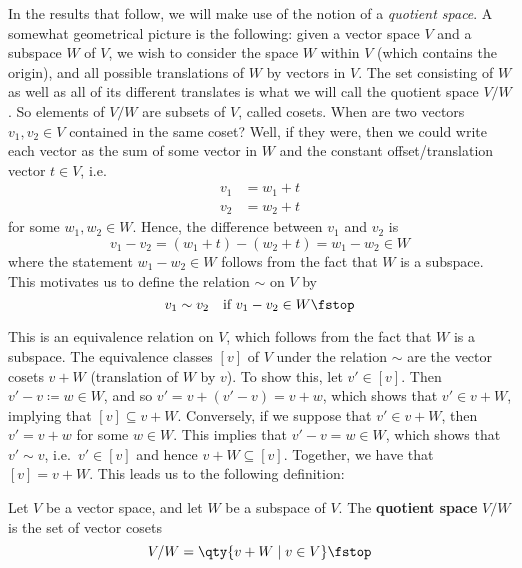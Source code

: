  In the results that follow, we will make use of the notion of a \emph{quotient space}. A somewhat geometrical picture is the following: given a vector space \( V \) and a subspace \( W \) of \( V \), we wish to consider the space \( W \) within \( V \) (which contains the origin), and all possible translations of \( W \) by vectors in \( V \). The set consisting of \( W \) as well as all of its different translates is what we will call the quotient space \( V/W \). So elements of \( V/W \) are subsets of \( V \), called cosets. When are two vectors \( v_1,v_2\in V \) contained in the same coset? Well, if they were, then we could write each vector as the sum of some vector in \( W \) and the constant offset/translation vector \( t\in V \), i.e.\
 \begin{align*}
   v_1&= w_1+t\\
   v_2&= w_2+t
 \end{align*}
 for some \( w_1,w_2\in W \). Hence, the difference between \( v_1 \) and \( v_2 \) is
 \[ v_1-v_2=(w_1+t)-(w_2+t)=w_1-w_2\in W \]
 where the statement \( w_1-w_2\in W \) follows from the fact that \( W \) is a subspace. This motivates us to define the relation \( \sim \) on \( V \) by
 \[ v_1\sim v_2\quad\text{if }v_1-v_2\in W\fstop \]

 This is an equivalence relation on \( V \), which follows from the fact that \( W \) is a subspace. The equivalence classes \( [v] \) of \( V \) under the relation \( \sim \) are the vector cosets \( v+W \) (translation of \( W \) by \( v \)). To show this, let \( v'\in [v] \). Then \( v'-v\coloneqq w\in W \), and so \( v'=v+(v'-v)=v+w \), which shows that \( v'\in v+W \), implying that \( [v]\subseteq v+W \). Conversely, if we suppose that \( v'\in v+W \), then \( v'=v+w \) for some \( w\in W \). This implies that \( v'-v=w\in W \), which shows that \( v'\sim v \), i.e.\ \( v'\in [v] \) and hence \( v+W\subseteq [v] \). Together, we have that \( [v]=v+W \). This leads us to the following definition:
 
 \begin{definition}
   Let \( V \) be a vector space, and let \( W \) be a subspace of \( V \). The \textbf{quotient space} \( V/W \) is the set of vector cosets
   \[ V/W=\qty{v+W\mid v\in V}\fstop \]
 \end{definition}

